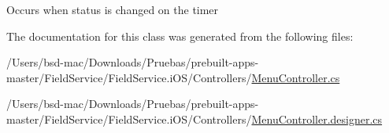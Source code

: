Occurs when status is changed on the timer 



The documentation for this class was generated from the following files\+:\begin{DoxyCompactItemize}
\item 
/\+Users/bsd-\/mac/\+Downloads/\+Pruebas/prebuilt-\/apps-\/master/\+Field\+Service/\+Field\+Service.\+i\+O\+S/\+Controllers/\hyperlink{_menu_controller_8cs}{Menu\+Controller.\+cs}\item 
/\+Users/bsd-\/mac/\+Downloads/\+Pruebas/prebuilt-\/apps-\/master/\+Field\+Service/\+Field\+Service.\+i\+O\+S/\+Controllers/\hyperlink{_menu_controller_8designer_8cs}{Menu\+Controller.\+designer.\+cs}\end{DoxyCompactItemize}

